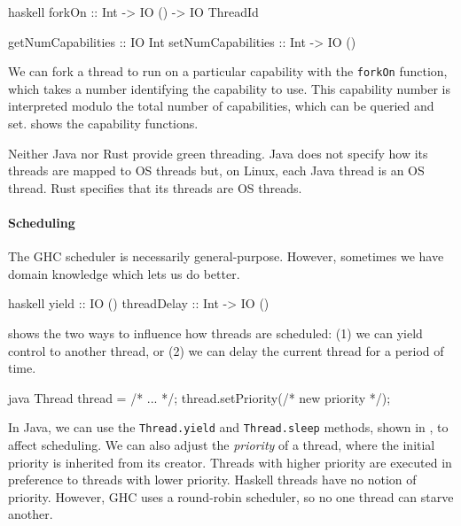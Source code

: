 \begin{listing}
\centering
\begin{cminted}{haskell}
forkOn             :: Int -> IO () -> IO ThreadId

getNumCapabilities :: IO Int
setNumCapabilities :: Int -> IO ()
\end{cminted}
\caption{Operating system threads in Haskell.}\label{lst:caps_haskell}
\end{listing}

We can fork a thread to run on a particular capability with the
\verb|forkOn| function, which takes a number identifying the
capability to use.  This capability number is interpreted modulo the
total number of capabilities, which can be queried and set.
 shows the capability functions.

Neither Java nor Rust provide green threading.  Java does not specify
how its threads are mapped to OS threads but, on Linux, each Java
thread is an OS thread.  Rust specifies that its threads are OS
threads.

\paragraph{Scheduling}
The GHC scheduler is necessarily general-purpose.  However, sometimes
we have domain knowledge which lets us do better.

\begin{listing}
\centering
\begin{cminted}{haskell}
yield       :: IO ()
threadDelay :: Int -> IO ()
\end{cminted}
\caption{Controlling thread scheduling in Haskell.}\label{lst:schedule_haskell}
\end{listing}

 shows the two ways to influence how
threads are scheduled: (1) we can yield control to another thread, or
(2) we can delay the current thread for a period of time.

\begin{listing}
\centering
\begin{cminted}{java}
Thread thread = /* ... */;
thread.setPriority(/* new priority */);
\end{cminted}
\caption{Thread priority in Java.}\label{lst:schedule_java}
\end{listing}

In Java, we can use the \verb|Thread.yield| and \verb|Thread.sleep|
methods, shown in , to affect scheduling.  We
can also adjust the \emph{priority} of a thread, where the initial
priority is inherited from its creator.  Threads with higher priority
are executed in preference to threads with lower priority.  Haskell
threads have no notion of priority.  However, GHC uses a round-robin
scheduler, so no one thread can starve another.


